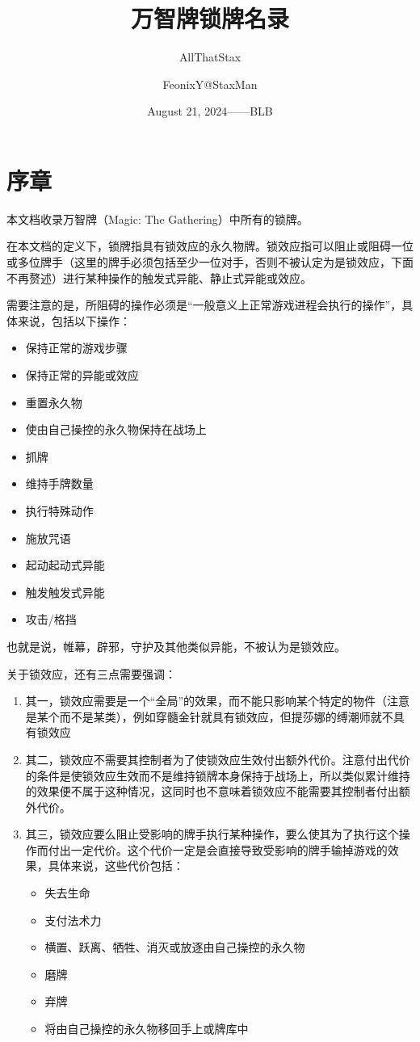 \documentclass[lang = cn, color = black, 10pt]{AllThatStax}
\title{万智牌锁牌名录}
\subtitle{AllThatStax}
\author{FeonixY@StaxMan}
\date{August 21, 2024——BLB}
\begin{document}
\maketitle
\frontmatter

\chapter*{序章}

本文档收录万智牌（Magic: The Gathering）中所有的锁牌。

在本文档的定义下，锁牌指具有锁效应的永久物牌。锁效应指可以阻止或阻碍一位或多位牌手（这里的牌手必须包括至少一位对手，否则不被认定为是锁效应，下面不再赘述）进行某种操作的触发式异能、静止式异能或效应。

需要注意的是，所阻碍的操作必须是“一般意义上正常游戏进程会执行的操作”，具体来说，包括以下操作：

\begin{itemize}
	\item 保持正常的游戏步骤
	\item 保持正常的异能或效应
	\item 重置永久物
	\item 使由自己操控的永久物保持在战场上
	\item 抓牌
	\item 维持手牌数量
	\item 执行特殊动作
	\item 施放咒语
	\item 起动起动式异能
	\item 触发触发式异能
	\item 攻击/格挡
\end{itemize}

也就是说，帷幕，辟邪，守护及其他类似异能，不被认为是锁效应。

关于锁效应，还有三点需要强调：

\begin{enumerate}
	\item 其一，锁效应需要是一个“全局”的效果，而不能只影响某个特定的物件（注意是某个而不是某类），例如穿髓金针就具有锁效应，但提莎娜的缚潮师就不具有锁效应
	\item 其二，锁效应不需要其控制者为了使锁效应生效付出额外代价。注意付出代价的条件是使锁效应生效而不是维持锁牌本身保持于战场上，所以类似累计维持的效果便不属于这种情况，这同时也不意味着锁效应不能需要其控制者付出额外代价。
	\item 其三，锁效应要么阻止受影响的牌手执行某种操作，要么使其为了执行这个操作而付出一定代价。这个代价一定是会直接导致受影响的牌手输掉游戏的效果，具体来说，这些代价包括：
		\begin{itemize}
			\item 失去生命
			\item 支付法术力
			\item 横置、跃离、牺牲、消灭或放逐由自己操控的永久物
			\item 磨牌
			\item 弃牌
			\item 将由自己操控的永久物移回手上或牌库中
		\end{itemize}
\end{enumerate}
\end{document}
